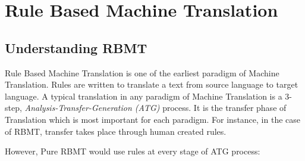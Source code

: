 \chapter{Rule Based Machine Translation}
\section{Understanding RBMT}
    Rule Based Machine Translation is one of the earliest paradigm of Machine Translation. Rules are written to translate a text from source language to target language. A typical translation in any paradigm of Machine Translation is a 3-step, \textit{Analysis-Transfer-Generation (ATG)} process. It is the transfer phase of Translation which is most important for each paradigm. For instance, in the case of RBMT, transfer takes place through human created rules.
    
    However, Pure RBMT would use rules at every stage of ATG process\cite{bhattacharyya}:
    
